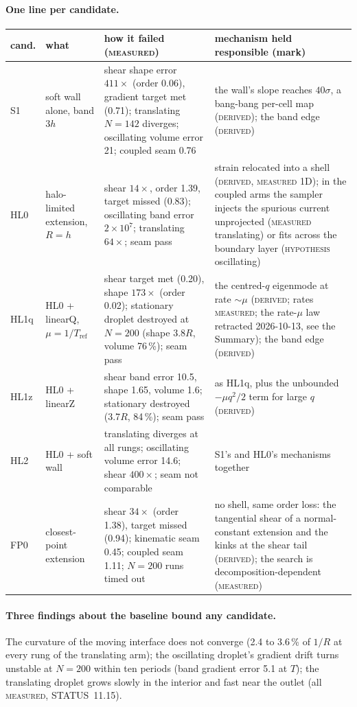 \documentclass[11pt,a4paper]{article}
\newcommand{\Meas}{\textsc{measured}}
\newcommand{\Der}{\textsc{derived}}
\newcommand{\Hyp}{\textsc{hypothesis}}
\begin{document}
\paragraph{One line per candidate.}
\begin{center}\small
\begin{tabular}{@{}L{1.1cm}L{3.2cm}L{5.4cm}L{5.1cm}@{}}
\toprule
cand. & what & how it failed (\Meas) & mechanism held responsible (mark) \\
\midrule
S1 & soft wall alone, band $3h$ & shear shape error $411\times$ (order 0.06), gradient target met (0.71); translating $N{=}142$ diverges; oscillating volume error 21; coupled seam 0.76 & the wall's slope reaches $40\sigma$, a bang-bang per-cell map (\Der); the band edge (\Der) \\
HL0 & halo-limited extension, $R=h$ & shear $14\times$, order 1.39, target missed (0.83); oscillating band error $2\times10^7$; translating $64\times$; seam pass & strain relocated into a shell (\Der, \Meas{} 1D); in the coupled arms the sampler injects the spurious current unprojected (\Meas{} translating) or fits across the boundary layer (\Hyp{} oscillating) \\
HL1q & HL0 + linearQ, $\mu=1/T_\mathrm{ref}$ & shear target met (0.20), shape $173\times$ (order 0.02); stationary droplet destroyed at $N{=}200$ (shape $3.8R$, volume 76\,\%); seam pass & the centred-$q$ eigenmode at rate $\sim\mu$ (\Der; rates \Meas; the rate-$\mu$ law retracted 2026-10-13, see the Summary); the band edge (\Der) \\
HL1z & HL0 + linearZ & shear band error 10.5, shape 1.65, volume 1.6; stationary destroyed (3.7$R$, 84\,\%); seam pass & as HL1q, plus the unbounded $-\mu q^2/2$ term for large $q$ (\Der) \\
HL2 & HL0 + soft wall & translating diverges at all rungs; oscillating volume error 14.6; shear $400\times$; seam not comparable & S1's and HL0's mechanisms together \\
FP0 & closest-point extension & shear $34\times$ (order 1.38), target missed (0.94); kinematic seam 0.45; coupled seam 1.11; $N{=}200$ runs timed out & no shell, same order loss: the tangential shear of a normal-constant extension and the kinks at the shear tail (\Der); the search is decomposition-dependent (\Meas) \\
\bottomrule
\end{tabular}
\end{center}

\paragraph{Three findings about the baseline bound any candidate.} The curvature of the
moving interface does not converge (2.4 to 3.6\,\% of $1/R$ at every rung of the translating
arm); the oscillating droplet's gradient drift turns unstable at $N=200$ within ten periods
(band gradient error 5.1 at $T$); the translating droplet grows slowly in the interior and fast
near the outlet (all \Meas, STATUS~11.15).
\end{document}
